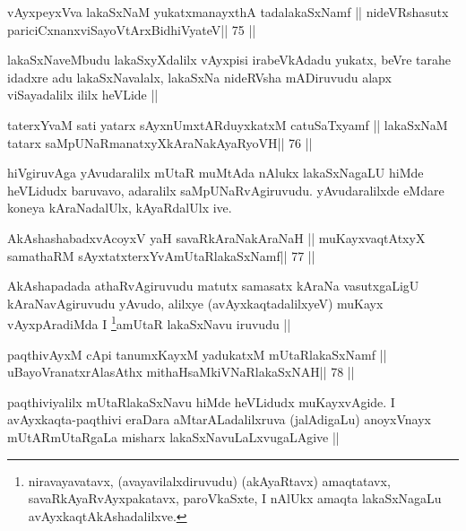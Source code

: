\begin{shl}
vAyxpeyxVva lakaSxNaM yukatxmanayxthA tadalakaSxNamf ||
nideVRshasutx pariciCxnanxviSayoV\s tArxBidhiVyateV\hfill || 75 ||
\end{shl}

\begin{artha}
lakaSxNaveMbudu lakaSxyXdalilx vAyxpisi irabeVkAdadu yukatx, beVre
tarahe idadxre adu lakaSxNavalalx, lakaSxNa nideRVsha mADiruvudu alapx
viSayadalilx ililx heVLide ||
\end{artha}


\begin{shl}
taterxYvaM sati yatarx sAyxnUmxtARduyxkatxM catuSaTxyamf ||
lakaSxNaM tatarx saMpUNaRmanatxyXkAraNakAyaRyoVH\hfill || 76 ||
\end{shl}

\begin{artha}
hiVgiruvAga yAvudaralilx mUtaR muMtAda nAlukx lakaSxNagaLU hiMde
heVLidudx baruvavo, adaralilx saMpUNaRvAgiruvudu. yAvudaralilxde
eMdare koneya kAraNadalUlx, kAyaRdalUlx ive. 
\end{artha}


\begin{shl}
AkAshashabadxvAcoyxV yaH savaRkAraNakAraNaH ||
muKayxvaqtAtxyX samathaRM sAyxtatxterxYvAmUtaRlakaSxNamf\hfill || 77 ||
\end{shl}

\begin{artha}
AkAshapadada athaRvAgiruvudu matutx samasatx kAraNa vasutxgaLigU
kAraNavAgiruvudu yAvudo, alilxye (avAyxkaqtadalilxyeV) muKayx
vAyxpAradiMda I \footnote[1]{niravayavatavx, (avayavilalxdiruvudu)
  (akAyaRtavx) amaqtatavx, savaRkAyaRvAyxpakatavx, paroVkaSxte, I
  nAlUkx amaqta lakaSxNagaLu avAyxkaqtAkAshadalilxve.}amUtaR lakaSxNavu iruvudu ||
\end{artha}



\begin{shl}
paqthivAyxM cApi tanumxKayxM yadukatxM \footnotemark[2]mUtaRlakaSxNamf ||
uBayoVranatxrAlasAthx mithaHsaMkiVNaRlakaSxNAH\hfill || 78 ||
\end{shl}

\begin{artha}
paqthiviyalilx mUtaRlakaSxNavu hiMde heVLidudx muKayxvAgide. I
avAyxkaqta-paqthivi eraDara aMtarALadalilxruva (jalAdigaLu) anoyxVnayx
mUtARmUtaRgaLa misharx lakaSxNavuLaLxvugaLAgive ||
\end{artha}

